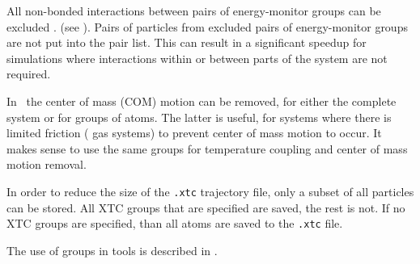 \begin{description}
All non-bonded interactions between pairs of energy-monitor groups can
be excluded
{.}
{(see ).}
Pairs of particles from excluded pairs of energy-monitor groups
are not put into the pair list.
This can result in a significant speedup
for simulations where interactions within or between parts of the system
are not required.

\item[\swapindex{center of mass}{group}\index{removing COM motion}]
In \gromacs\ the center of mass (COM) motion can be removed, for
either the complete system or for groups of atoms. The latter is
useful, {\eg} for systems where there is limited friction ({\eg} gas
systems) to prevent center of mass motion to occur. It makes sense to
use the same groups for temperature coupling and center of mass motion
removal.

\item[\swapindex{XTC output}{group}]
In order to reduce the size of the {\tt .xtc{}} trajectory file, only a subset
of all particles can be stored. All XTC groups that are specified
are saved, the rest is not. If no XTC groups are specified, than all
atoms are saved to the {\tt .xtc} file.

\end{description}
The use of groups in {\gromacs} tools is described in
.

